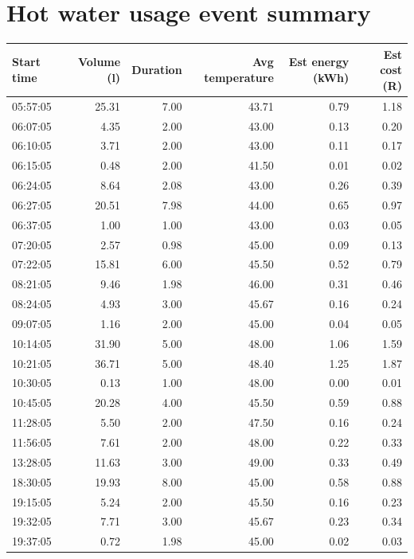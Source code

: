 \documentclass{article}\usepackage[]{graphicx}\usepackage[]{color}
\newenvironment{knitrout}{}{} %
\begin{document}
\newpage
\section{Hot water usage event summary}
\begin{center}

\begin{knitrout}
\color{fgcolor}
\begin{tabular}{l|r|r|r|r|r}
\hline
Start time & Volume (l) & Duration & Avg temperature & Est energy (kWh) & Est cost (R)\\
\hline
05:57:05 & 25.31 & 7.00 & 43.71 & 0.79 & 1.18\\
\hline
06:07:05 & 4.35 & 2.00 & 43.00 & 0.13 & 0.20\\
\hline
06:10:05 & 3.71 & 2.00 & 43.00 & 0.11 & 0.17\\
\hline
06:15:05 & 0.48 & 2.00 & 41.50 & 0.01 & 0.02\\
\hline
06:24:05 & 8.64 & 2.08 & 43.00 & 0.26 & 0.39\\
\hline
06:27:05 & 20.51 & 7.98 & 44.00 & 0.65 & 0.97\\
\hline
06:37:05 & 1.00 & 1.00 & 43.00 & 0.03 & 0.05\\
\hline
07:20:05 & 2.57 & 0.98 & 45.00 & 0.09 & 0.13\\
\hline
07:22:05 & 15.81 & 6.00 & 45.50 & 0.52 & 0.79\\
\hline
08:21:05 & 9.46 & 1.98 & 46.00 & 0.31 & 0.46\\
\hline
08:24:05 & 4.93 & 3.00 & 45.67 & 0.16 & 0.24\\
\hline
09:07:05 & 1.16 & 2.00 & 45.00 & 0.04 & 0.05\\
\hline
10:14:05 & 31.90 & 5.00 & 48.00 & 1.06 & 1.59\\
\hline
10:21:05 & 36.71 & 5.00 & 48.40 & 1.25 & 1.87\\
\hline
10:30:05 & 0.13 & 1.00 & 48.00 & 0.00 & 0.01\\
\hline
10:45:05 & 20.28 & 4.00 & 45.50 & 0.59 & 0.88\\
\hline
11:28:05 & 5.50 & 2.00 & 47.50 & 0.16 & 0.24\\
\hline
11:56:05 & 7.61 & 2.00 & 48.00 & 0.22 & 0.33\\
\hline
13:28:05 & 11.63 & 3.00 & 49.00 & 0.33 & 0.49\\
\hline
18:30:05 & 19.93 & 8.00 & 45.00 & 0.58 & 0.88\\
\hline
19:15:05 & 5.24 & 2.00 & 45.50 & 0.16 & 0.23\\
\hline
19:32:05 & 7.71 & 3.00 & 45.67 & 0.23 & 0.34\\
\hline
19:37:05 & 0.72 & 1.98 & 45.00 & 0.02 & 0.03\\
\hline
\end{tabular}


\end{knitrout}
\end{center}
\newpage
\end{document}
